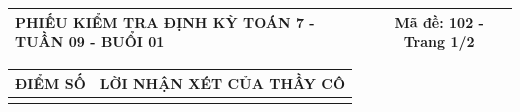 \documentclass[12pt,a4paper]{article}
\begin{document}
\newpage
\noindent
\begin{tabularx}{\linewidth}{|X|c|}
\hline
\textbf{PHIẾU KIỂM TRA ĐỊNH KỲ TOÁN 7 - TUẦN 09 - BUỔI 01} & \textbf{Mã đề: 102 - Trang 1/2} \\
\hline
\end{tabularx}

\vspace{1.2mm}

\noindent
\begin{tabularx}{\linewidth}{|p{3.2cm}|X|}
\hline
\centering\textbf{ĐIỂM SỐ} & \centering\textbf{LỜI NHẬN XÉT CỦA THẦY CÔ} \tabularnewline
\hline
\rule{0pt}{1.8cm} & \tabularnewline
\hline
\end{tabularx}
\end{document}
